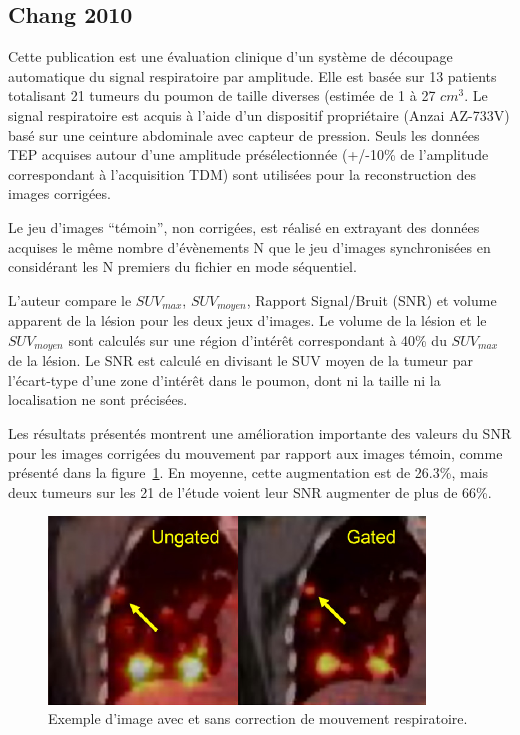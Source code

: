 \subsection{Chang 2010}

Cette publication est une évaluation clinique d'un système de découpage automatique du signal respiratoire par amplitude. Elle est basée sur 13 patients totalisant 21 tumeurs du poumon de taille diverses (estimée de 1 à 27 $cm^3$. Le signal respiratoire est acquis à l'aide d'un dispositif propriétaire (Anzai AZ-733V) basé sur une ceinture abdominale avec capteur de pression. Seuls les données TEP acquises autour d'une amplitude présélectionnée (+/-10\% de l'amplitude correspondant à l'acquisition TDM) sont utilisées pour la reconstruction des images corrigées. 

Le jeu d'images ``témoin'', non corrigées, est réalisé en extrayant des données acquises le même nombre d'évènements N que le jeu d'images synchronisées en considérant les N premiers du fichier en mode séquentiel.

L'auteur compare le $SUV_{max}$, $SUV_{moyen}$, Rapport Signal/Bruit (SNR) et volume apparent de la lésion pour les deux jeux d'images. Le volume de la lésion et le $SUV _{moyen}$ sont calculés sur une région d'intérêt correspondant à 40\% du $SUV_{max}$ de la lésion. Le SNR est calculé en divisant le SUV moyen de la tumeur par l'écart-type d'une zone d'intérêt dans le poumon, dont ni la taille ni la localisation ne sont précisées. 

Les résultats présentés montrent une amélioration importante des valeurs du SNR pour les images corrigées du mouvement par rapport aux images témoin, comme présenté dans la figure~\ref{fig:guoping2010Exemple}. En moyenne, cette augmentation est de 26.3\%, mais deux tumeurs sur les 21 de l'étude voient leur SNR augmenter de plus de 66\%. 

\begin{figure}[h!]
	\begin{center}
			\includegraphics[width=10cm]{images/guoping2010Exemple}
	\end{center}
	\caption{Exemple d'image avec et sans correction de mouvement respiratoire.} 
	\label{fig:guoping2010Exemple}
\end{figure}




